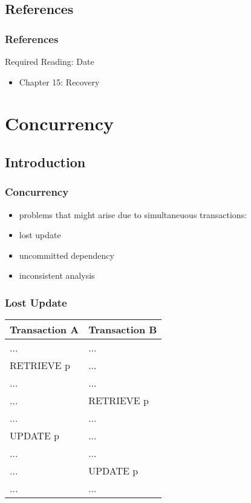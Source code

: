 \documentclass[dvipsnames]{beamer}
\theoremstyle{plain}
\begin{document}
\subsection*{References}

\begin{frame}
  \frametitle{References}

  \begin{block}{Required Reading: Date}
    \begin{itemize}
      \item Chapter 15: \alert{Recovery}
    \end{itemize}
  \end{block}
\end{frame}

\section{Concurrency}

\subsection{Introduction}

\begin{frame}
  \frametitle{Concurrency}

  \begin{itemize}
    \item problems that might arise due to simultaneuous transactions:

    \bigskip
    \item lost update
    \item uncommitted dependency
    \item inconsistent analysis
  \end{itemize}
\end{frame}

\begin{frame}[fragile]
  \frametitle{Lost Update}

  \begin{example}
    \begin{table}
      \begin{tabular}{ll}
Transaction A & Transaction B\\\hline
...           & ...          \\\pause
RETRIEVE p    & ...          \\\pause
...           & ...          \\
...           & RETRIEVE p   \\\pause
...           & ...          \\
UPDATE p      & ...          \\\pause
...           & ...          \\
...           & UPDATE p     \\
...           & ...
      \end{tabular}
    \end{table}
  \end{example}
\end{frame}
\end{document}
